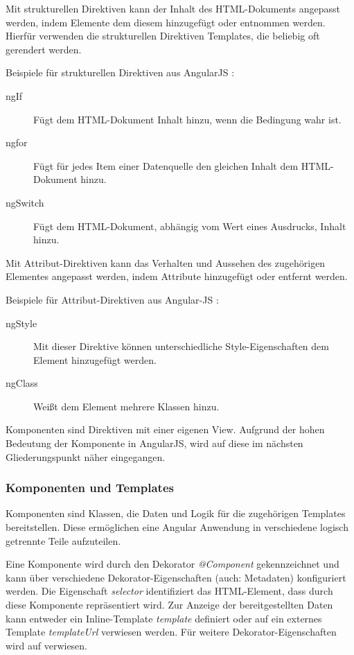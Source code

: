 Mit strukturellen Direktiven kann der Inhalt des HTML-Dokuments angepasst werden, indem Elemente dem diesem hinzugefügt oder entnommen werden. Hierfür verwenden die strukturellen Direktiven Templates, die beliebig oft gerendert werden. \autocites[vgl.][269\psqq]{Steyer.2017}[vgl.][365]{Freeman.2018}

Beispiele für strukturellen Direktiven aus AngularJS \autocite[vgl.][261\psqq]{Freeman.2018}:
\begin{description}
	\item [ngIf] Fügt dem HTML-Dokument Inhalt hinzu, wenn die Bedingung wahr ist. 
	\item [ngfor] Fügt für jedes Item einer Datenquelle den gleichen Inhalt dem HTML-Dokument hinzu.
	\item [ngSwitch] Fügt dem HTML-Dokument, abhängig vom Wert eines Ausdrucks, Inhalt hinzu.
\end{description} 

Mit Attribut-Direktiven kann das Verhalten und Aussehen des zugehörigen Elementes angepasst werden, indem Attribute hinzugefügt oder entfernt werden. \autocite[vgl.][339]{Freeman.2018} 

Beispiele für Attribut-Direktiven aus Angular-JS \autocite[vgl.][249\psqq]{Freeman.2018}:
\begin{description}
	\item [ngStyle] Mit dieser Direktive können unterschiedliche Style-Eigenschaften dem Element hinzugefügt werden.
	\item [ngClass] Weißt dem Element mehrere Klassen hinzu. 
\end{description}

Komponenten sind Direktiven mit einer eigenen View. \autocites[vgl.][265]{Steyer.2017}[vgl.][401]{Freeman.2018} Aufgrund der hohen Bedeutung der Komponente in AngularJS, wird auf diese im nächsten Gliederungspunkt näher eingegangen.

\subsubsection{Komponenten und Templates}

Komponenten sind Klassen, die Daten und Logik für die zugehörigen Templates bereitstellen. Diese ermöglichen eine Angular Anwendung in verschiedene logisch getrennte Teile aufzuteilen. \autocite[vgl.][401]{Freeman.2018} 

Eine Komponente wird durch den Dekorator \textit{@Component} gekennzeichnet und kann über verschiedene Dekorator-Eigenschaften (auch: Metadaten) konfiguriert werden. Die Eigenschaft \textit{selector} identifiziert das HTML-Element, dass durch diese Komponente repräsentiert wird. Zur Anzeige der bereitgestellten Daten kann entweder ein Inline-Template \textit{template} definiert oder auf ein externes Template \textit{templateUrl} verwiesen werden. \autocites[vgl.]{Google.b}[vgl.][405]{Freeman.2018}[vgl.][47\psqq]{Steyer.2017} Für weitere Dekorator-Eigenschaften wird auf \textcite[405]{Freeman.2018} verwiesen.



